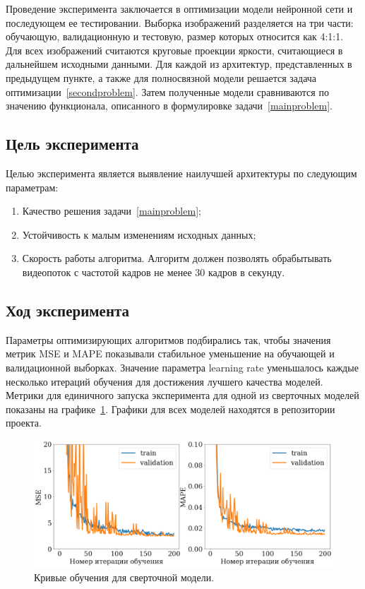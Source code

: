 \documentclass[12pt, twoside]{article}
\begin{document}
Проведение эксперимента заключается в оптимизации модели нейронной сети и последующем ее тестировании. Выборка изображений разделяется на три части: обучающую, валидационную и тестовую, размер которых относится как 4:1:1. Для всех изображений считаются круговые проекции яркости, считающиеся в дальнейшем исходными данными. Для каждой из архитектур, представленных в предыдущем пункте, а также для полносвязной модели решается задача оптимизации~\eqref{secondproblem}. Затем полученные модели сравниваются по значению функционала, описанного в формулировке задачи~\eqref{mainproblem}.

\subsection{Цель эксперимента}

Целью эксперимента является выявление наилучшей архитектуры по следующим параметрам:
\begin{enumerate}
	\item Качество решения задачи~\eqref{mainproblem};
	\item Устойчивость к малым изменениям исходных данных;
	\item Скорость работы алгоритма. Алгоритм должен позволять обрабытывать видеопоток с частотой кадров не менее 30 кадров в секунду.
\end{enumerate}

\subsection{Ход эксперимента}
Параметры оптимизирующих алгоритмов подбирались так, чтобы значения метрик MSE и MAPE показывали стабильное уменьшение на обучающей и валидационной выборках. Значение параметра learning rate уменьшалось каждые несколько итераций обучения для достижения лучшего качества моделей. Метрики для единичного запуска эксперимента для одной из сверточных моделей показаны на графике~\ref{fig:singleexp}. Графики для всех моделей находятся в репозитории проекта.
\begin{figure}[b]
	\centering
	\includegraphics[scale=0.4]{img/single_experiment.pdf}
	\caption{Кривые обучения для сверточной модели.}
	\label{fig:singleexp}
\end{figure}
\end{document}

